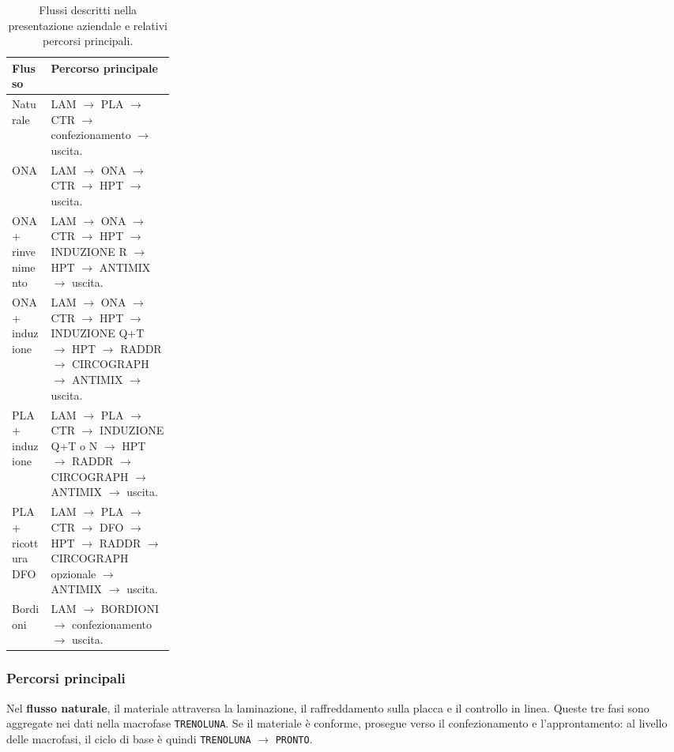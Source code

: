 \begin{table}[htbp]
\centering
\caption{Flussi descritti nella presentazione aziendale e relativi percorsi principali.}
\label{tab:documented-base-cycles}
\small
\begin{tabularx}{\linewidth}{@{}p{0.24\linewidth}>{\raggedright\arraybackslash}X@{}}
\toprule
\textbf{Flusso} & \textbf{Percorso principale} \\
\midrule
Naturale &
LAM $\rightarrow$ PLA $\rightarrow$ CTR $\rightarrow$ confezionamento $\rightarrow$ uscita. \\
\addlinespace
ONA &
LAM $\rightarrow$ ONA $\rightarrow$ CTR $\rightarrow$ HPT $\rightarrow$ uscita. \\
\addlinespace
ONA + rinvenimento &
LAM $\rightarrow$ ONA $\rightarrow$ CTR $\rightarrow$ HPT $\rightarrow$ INDUZIONE R $\rightarrow$ HPT $\rightarrow$ ANTIMIX $\rightarrow$ uscita. \\
\addlinespace
ONA + induzione &
LAM $\rightarrow$ ONA $\rightarrow$ CTR $\rightarrow$ HPT $\rightarrow$ INDUZIONE Q+T $\rightarrow$ HPT $\rightarrow$ RADDR $\rightarrow$ CIRCOGRAPH $\rightarrow$ ANTIMIX $\rightarrow$ uscita. \\
\addlinespace
PLA + induzione &
LAM $\rightarrow$ PLA $\rightarrow$ CTR $\rightarrow$ INDUZIONE Q+T o N $\rightarrow$ HPT $\rightarrow$ RADDR $\rightarrow$ CIRCOGRAPH $\rightarrow$ ANTIMIX $\rightarrow$ uscita. \\
\addlinespace
PLA + ricottura DFO &
LAM $\rightarrow$ PLA $\rightarrow$ CTR $\rightarrow$ DFO $\rightarrow$ HPT $\rightarrow$ RADDR $\rightarrow$ CIRCOGRAPH opzionale $\rightarrow$ ANTIMIX $\rightarrow$ uscita. \\
\addlinespace
Bordioni &
LAM $\rightarrow$ BORDIONI $\rightarrow$ confezionamento $\rightarrow$ uscita. \\
\bottomrule
\end{tabularx}
\end{table}

\subsubsection{Percorsi principali}

Nel \textbf{flusso naturale}, il materiale attraversa la laminazione, il raffreddamento sulla placca e il controllo in linea. Queste tre fasi sono aggregate nei dati nella macrofase \texttt{TRENOLUNA}. Se il materiale è conforme, prosegue verso il confezionamento e l'approntamento: al livello delle macrofasi, il ciclo di base è quindi \texttt{TRENOLUNA} $\rightarrow$ \texttt{PRONTO}.

